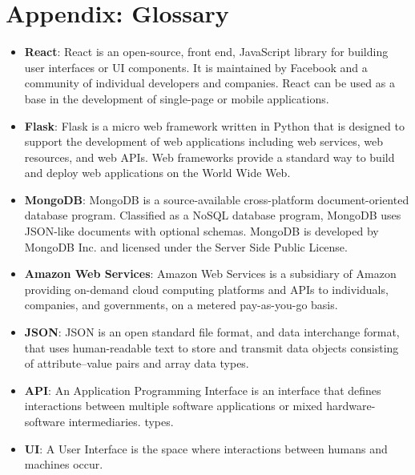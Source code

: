 \documentclass[12pt, a4]{report}
\begin{document}
\chapter*{Appendix: Glossary}
\begin{itemize}
    \item \textbf{React}: React is an open-source, front end, JavaScript library for building user interfaces or UI components. It is maintained by Facebook and a community of individual developers and companies. React can be used as a base in the development of single-page or mobile applications.
    \item \textbf{Flask}: Flask is a micro web framework written in Python that is designed to support the development of web applications including web services, web resources, and web APIs. Web frameworks provide a standard way to build and deploy web applications on the World Wide Web.
    \item \textbf{MongoDB}: MongoDB is a source-available cross-platform document-oriented database program. Classified as a NoSQL database program, MongoDB uses JSON-like documents with optional schemas. MongoDB is developed by MongoDB Inc. and licensed under the Server Side Public License.
    \item \textbf{Amazon Web Services}: Amazon Web Services is a subsidiary of Amazon providing on-demand cloud computing platforms and APIs to individuals, companies, and governments, on a metered pay-as-you-go basis.
    \item \textbf{JSON}: JSON is an open standard file format, and data interchange format, that uses human-readable text to store and transmit data objects consisting of attribute–value pairs and array data types.
    \item \textbf{API}: An Application Programming Interface is an interface that defines interactions between multiple software applications or mixed hardware-software intermediaries. types.
    \item \textbf{UI}: A User Interface is the space where interactions between humans and machines occur.
\end{itemize}
\end{document}
